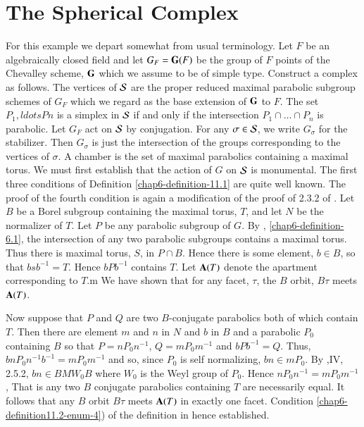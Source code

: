 \section*{The Spherical Complex}
 For this example we depart somewhat from usual  terminology. Let $F$ be an algebraically closed field and let $G_{F} = \mathbf{G}(F)$ be the group of $F$ points of the Chevalley scheme, $\mathbf{G}$ which we assume to be of simple type. Construct a complex as follows. The vertices of $\mathcal{S}$ are the proper reduced maximal parabolic subgroup schemes of $G_{F}$ which we regard as the base extension of $\mathbf{G}$ to $F$. The set $P_{1},ldots P{n}$ is a simplex in $\mathcal{S}$ if and only if the intersection  $P_{1}\cap \ldots \cap P_{n}$ is parabolic. Let $G_{F}$ act on $\mathcal{S}$ by conjugation. For any $\sigma \in \mathcal{S}$, we write $G_{\sigma}$ for the stabilizer. Then $G_{\sigma}$ is just the intersection of the groups corresponding to the vertices of $\sigma$. A chamber is the set of maximal parabolics containing a maximal torus. We must first establish that the action of $G$ on $\mathcal{S}$ is monumental. The first three conditions of Definition \ref{chap6-definition-11.1} are quite well  known. The proof of the fourth condition is again a modification of the proof of 2.3.2 of \cite{chap6-keyBT-I}. Let $B$ be a Borel subgroup containing the maximal torus, $T$, and let $N$ be the normalizer of $T$. Let $P$ be any parabolic subgroup of $G$. By \cite{chap6-keyH}, \ref{chap6-definition-6.1}, the intersection of any two parabolic subgroups contains a maximal torus. Thus there is maximal torus, $S$, in $P \cap B$. Hence there is some element, $b \in B$, so that $bsb^{-1} = T$. Hence $bPb^{-1}$ contains $T$. Let $\mathbf{A}(T)$ denote the apartment corresponding to $T$.m We have shown that for any facet, $\tau$, the $B$ orbit, $B\tau$  meets $\mathbf{A}(T)$.  

Now suppose that $P$ and $Q$ are two $B$-conjugate parabolics both of which contain $T$. Then there are element $m$ and $n$ in $N$ and $b$ in $B$ and a parabolic $P_{0}$ containing $B$ so that $P=nP_{0}n^{-1}$, $Q=m P_{0}m^{-1}$ and $bPb^{-1}=Q$. Thus, $bnP_{0}n^{-1}b^{-1} = mP_{0}m^{-1}$ and so, since $P_{0}$ is self normalizing, $bn \in m P_{0}$. By \cite{chap6-keyBo},\pageoriginale IV, 2.5.2, $bn \in BMW_{0} B$ where $W_{0}$ is the Weyl group of $P_{0}$. Hence $nP_{0}n^{-1} = mP_{0}m^{-1}$, That is any two $B$ conjugate parabolics containing $T$ are necessarily equal. It follows that any $B$ orbit $B\tau$ meets $\mathbf{A}(T)$ in exactly one facet. Condition \ref{chap6-definition11.2-enum-4}) of the definition in hence established.

